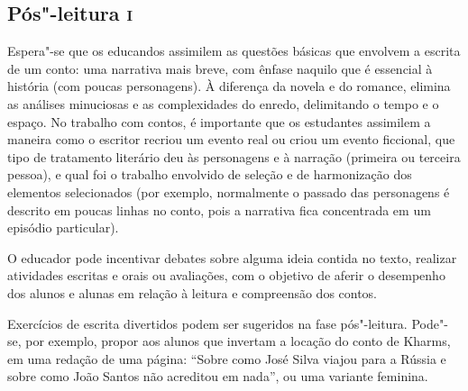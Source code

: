 \documentclass[11pt]{extarticle}
\begin{document}
\pagebreak

\subsection{Pós"-leitura \textsc{i}}



Espera"-se que os educandos assimilem as questões básicas que envolvem
a escrita de um conto: uma narrativa mais breve, com ênfase naquilo que
é essencial à história (com poucas personagens). À diferença da novela e
do romance, elimina as análises minuciosas e as complexidades do enredo,
delimitando o tempo e o espaço. No trabalho com contos, é importante que
os estudantes assimilem a maneira como o escritor recriou um evento real
ou criou um evento ficcional, que tipo de tratamento literário deu às
personagens e à narração (primeira ou terceira pessoa), e qual foi o
trabalho envolvido de seleção e de harmonização dos elementos
selecionados (por exemplo, normalmente o passado das personagens é
descrito em poucas linhas no conto, pois a narrativa fica concentrada em
um episódio particular).

O educador pode incentivar debates sobre alguma ideia contida no
texto, realizar atividades escritas e orais ou avaliações, com o
objetivo de aferir o desempenho dos alunos e alunas em relação à leitura
e compreensão dos contos.

Exercícios de escrita divertidos podem ser sugeridos na fase
pós"-leitura. Pode"-se, por exemplo, propor aos alunos que invertam a
locação do conto de Kharms, em uma redação de uma página: ``Sobre como
José Silva viajou para a Rússia e sobre como João Santos não acreditou
em nada'', ou uma variante feminina.

\end{document}
